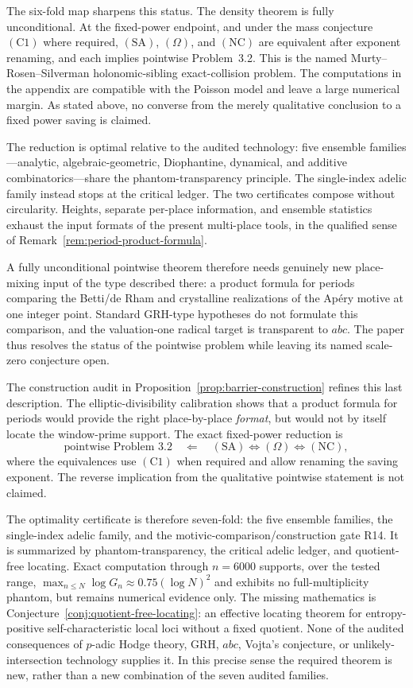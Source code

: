 \documentclass[11pt]{amsart}
\theoremstyle{plain}
\theoremstyle{remark}
\begin{document}
The six-fold map sharpens this status.  The density theorem is fully
unconditional.  At the fixed-power endpoint, and under the mass
conjecture $(\mathrm C1)$ where required, $(\mathrm{SA})$,
$(\Omega)$, and $(\mathrm{NC})$ are equivalent after exponent renaming,
and each implies pointwise Problem~3.2.  This is the named
Murty--Rosen--Silverman holonomic-sibling exact-collision problem.  The
computations in the appendix are compatible with the Poisson model and
leave a large numerical margin.  As stated above, no converse from the
merely qualitative conclusion to a fixed power saving is claimed.

The reduction is optimal relative to the audited technology: five
ensemble families---analytic, algebraic-geometric, Diophantine,
dynamical, and additive combinatorics---share the phantom-transparency
principle.  The single-index adelic family instead stops at the critical
ledger.  The two certificates compose without circularity.
Heights, separate per-place information, and ensemble statistics
exhaust the input formats of the present multi-place tools, in the
qualified sense of Remark~\ref{rem:period-product-formula}.

A fully unconditional pointwise theorem therefore needs genuinely new
place-mixing input of the type described there: a product formula for
periods comparing the Betti/de Rham and crystalline realizations of the
Ap\'ery motive at one integer point.  Standard GRH-type hypotheses do
not formulate this comparison, and the valuation-one radical target is
transparent to $abc$.  The paper thus resolves the status of the
pointwise problem while leaving its named scale-zero conjecture open.

The construction audit in Proposition~\ref{prop:barrier-construction}
refines this last description.  The elliptic-divisibility calibration
shows that a product formula for periods would provide the right
place-by-place \emph{format}, but would not by itself locate the
window-prime support.  The exact fixed-power reduction is
\[
 \text{pointwise Problem~3.2}
 \quad\Longleftarrow\quad
 (\mathrm{SA})\Longleftrightarrow(\Omega)
 \Longleftrightarrow(\mathrm{NC}),
\]
where the equivalences use $(\mathrm C1)$ when required and allow
renaming the saving exponent.  The reverse implication from the
qualitative pointwise statement is not claimed.

The optimality certificate is therefore seven-fold: the five ensemble
families, the single-index adelic family, and the
motivic-comparison/construction gate R14.  It is summarized by
phantom-transparency, the critical adelic ledger, and quotient-free
locating.  Exact computation through $n=6000$ supports, over the tested
range, $\max_{n\leq N}\log G_n\approx0.75(\log N)^2$ and exhibits
no full-multiplicity phantom, but remains numerical evidence only.
The missing mathematics is
Conjecture~\ref{conj:quotient-free-locating}: an effective locating
theorem for entropy-positive self-characteristic local loci without a
fixed quotient.  None of the audited consequences of $p$-adic Hodge
theory, GRH, $abc$, Vojta's conjecture, or unlikely-intersection
technology supplies it.  In this precise sense the required theorem is
new, rather than a new combination of the seven audited families.
\end{document}
